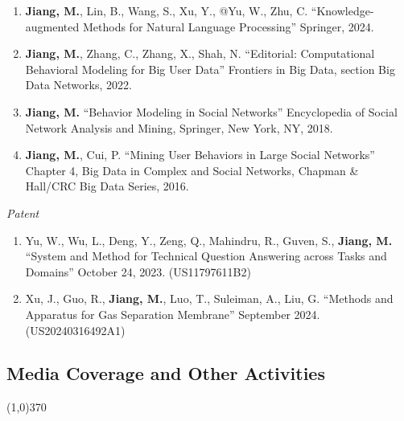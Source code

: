 \documentclass[10pt]{article}
\newenvironment{myindentpar}[1]%
{\begin{list}{}%
         {\setlength{\leftmargin}{#1}}%
         \item[]%
}
{\end{list}}
\newcounter{list}
\begin{document}
\begin{myindentpar}{0.00cm}
\begin{enumerate}[leftmargin=.5cm]
\item[B4] \textbf{Jiang, M.}, Lin, B., Wang, S., Xu, Y., @Yu, W., Zhu, C. ``Knowledge-augmented Methods for Natural Language Processing'' Springer, 2024.

\item[B3] \textbf{Jiang, M.}, Zhang, C., Zhang, X., Shah, N. ``Editorial: Computational Behavioral Modeling for Big User Data'' Frontiers in Big Data, section Big Data Networks, 2022.
		
\item[B2] \textbf{Jiang, M.} ``Behavior Modeling in Social Networks'' Encyclopedia of Social Network Analysis and Mining, Springer, New York, NY, 2018.
		
\item[B1] \textbf{Jiang, M.}, Cui, P. ``Mining User Behaviors in Large Social Networks'' Chapter 4, Big Data in Complex and Social Networks, Chapman \& Hall/CRC Big Data Series, 2016.

\end{enumerate}

\hspace{-0.25cm}\textit{Patent}

\begin{enumerate}[leftmargin=.5cm]

\item[P1] Yu, W., Wu, L., Deng, Y., Zeng, Q., Mahindru, R., Guven, S., \textbf{Jiang, M.} ``System and Method for Technical Question Answering across Tasks and Domains'' October 24, 2023. (US11797611B2)

\item[P2] Xu, J., Guo, R., \textbf{Jiang, M.}, Luo, T., Suleiman, A., Liu, G. ``Methods and Apparatus for Gas Separation Membrane'' September 2024. (US20240316492A1)

\end{enumerate}

\end{myindentpar}

\subsection{\sc Media Coverage and Other Activities}
\vspace{-0.4cm} \line(1,0){370} \vspace{-0.1cm}
\end{document}
